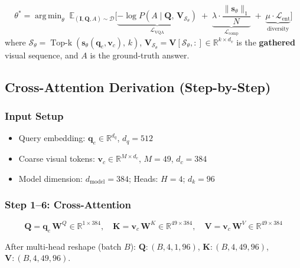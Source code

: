 \documentclass[11pt,a4paper]{article}
\DeclareMathOperator*{\argmin}{arg\,min}
\DeclareMathOperator{\TopK}{Top\text{-}k}
\newcommand{\R}{\mathbb{R}}
\newcommand{\E}{\mathbb{E}}
\newcommand{\vc}{\mathbf{v}_c}
\newcommand{\qe}{\mathbf{q}_e}
\newcommand{\vs}{\mathbf{s}}
\newcommand{\mI}{\mathbf{I}}
\newcommand{\mQ}{\mathbf{Q}}
\newcommand{\mV}{\mathbf{V}}
\begin{document}
\begin{definitionbox}[title={TC-ViTok Training Objective}]
\begin{equation}
  \theta^* = \argmin_{\theta} \;
    \E_{(\mI,\mQ,A)\sim\mathcal{D}} \Big[
      \underbrace{
        -\log P\!\left(A \mid \mQ,\,\mV_{\mathcal{S}_\theta}\right)
      }_{\mathcal{L}_{\text{VQA}}}
      \;+\; \underbrace{
        \lambda \cdot \frac{\lVert \vs_\theta \rVert_1}{N}
      }_{\mathcal{L}_{\text{comp}}}
      \;+\; \underbrace{
        \mu \cdot \mathcal{L}_{\text{ent}}
      }_{\text{diversity}}
    \Big]
  \label{eq:objective}
\end{equation}
where $\mathcal{S}_\theta = \TopK(\vs_\theta(\qe,\vc),\, k)$,
$\mV_{\mathcal{S}_\theta} = \mV[\mathcal{S}_\theta, :] \in \R^{k \times d_v}$
is the \textbf{gathered} visual sequence, and $A$ is the ground-truth answer.
\end{definitionbox}

\subsection{Cross-Attention Derivation (Step-by-Step)}
\label{subsec:cross_attn_deriv}

\subsubsection{Input Setup}

\begin{itemize}[leftmargin=1.5em, itemsep=1pt]
  \item Query embedding: $\qe \in \R^{d_q}$, $d_q = 512$
  \item Coarse visual tokens: $\vc \in \R^{M \times d_c}$, $M = 49$, $d_c = 384$
  \item Model dimension: $d_{\text{model}} = 384$; Heads: $H = 4$; $d_k = 96$
\end{itemize}

\subsubsection{Step 1--6: Cross-Attention}

\begin{equation}
  \mathbf{Q} = \qe\,\mathbf{W}^Q \in \R^{1 \times 384}, \quad
  \mathbf{K} = \vc\,\mathbf{W}^K \in \R^{49 \times 384}, \quad
  \mathbf{V} = \vc\,\mathbf{W}^V \in \R^{49 \times 384}
\end{equation}

After multi-head reshape (batch $B$):
$\mathbf{Q}\!:(B,4,1,96)$, $\mathbf{K}\!:(B,4,49,96)$, $\mathbf{V}\!:(B,4,49,96)$.
\end{document}
